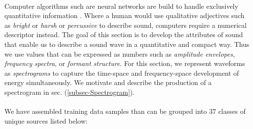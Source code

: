 \documentclass[12pt,letterpaper]{article}
\begin{document}
\paragraph*{}Computer algorithms such are neural networks are build to handle exclusively quantitative information \cite{Geron}. Where a human would use qualitative adjectives such as \textit{bright} or \textit{harsh} or \textit{percussive} to describe sound, computers require a numerical descriptor instead. The goal of this section is to develop the attributes of sound that enable us to describe a sound wave in a quantitative and compact way. Thus we use values that can be expressed as numbers such as \textit{amplitude envelopes}, \textit{frequency spectra}, or \textit{formant structure}. For this section, we represent waveforms as \textit{spectrograms} to capture the time-space and frequency-space development of energy simultaneously. We motivate and describe the production of a spectrogram in sec. (\ref{subsec-Spectrogram}).

\paragraph*{}We have assembled training data samples than can be grouped into $37$ classes of unique sources listed below:
\end{document}

